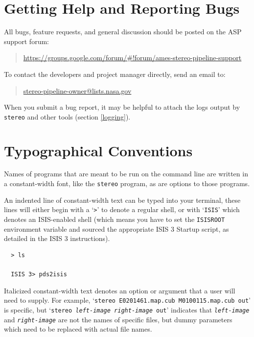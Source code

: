 \pagebreak
\section{Getting Help and Reporting Bugs}\label{get-help}

All bugs, feature requests, and general discussion should be posted
on the ASP support forum:
\begin{quote}
\indent \href{https://groups.google.com/forum/\#!forum/ames-stereo-pipeline-support}{https://groups.google.com/forum/\#!forum/ames-stereo-pipeline-support}
\end{quote}
To contact the developers and project manager directly, send an email
to:
\begin{quote}
\indent \href{mailto:stereo-pipeline-owner@lists.nasa.gov}{stereo-pipeline-owner@lists.nasa.gov}
\end{quote}

When you submit a bug report, it may be helpful to attach the logs
output by \texttt{stereo} and other tools (section \ref{logging}).

\section{Typographical Conventions}

Names of programs that are meant to be run on the command line are
written in a constant-width font, like the \texttt{stereo} program,
as are options to those programs.

An indented line of constant-width text can be typed into your
terminal, these lines will either begin with a `\texttt{>}' to
denote a regular shell, or with `\texttt{ISIS}' which denotes an
\ac{ISIS}-enabled shell (which means you have to set the \texttt{ISISROOT}
environment variable and sourced the appropriate \ac{ISIS} 3 Startup
script, as detailed in the \ac{ISIS} 3 instructions).
\begin{verbatim}
  > ls

  ISIS 3> pds2isis
\end{verbatim}

Italicized constant-width text denotes an option or argument that
a user will need to supply.  For example, `\texttt{stereo E0201461.map.cub
M0100115.map.cub out}' is specific, but `\texttt{stereo \textit{left-image
right-image} out}' indicates that \texttt{\textit{left-image}} and
\texttt{\textit{right-image}} are not the names of specific files,
but dummy parameters which need to be replaced with actual file
names.

